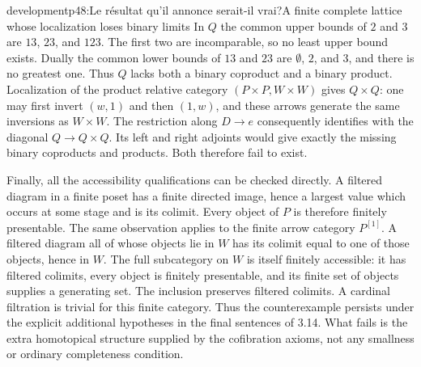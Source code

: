 \begin{dcomment}{development}{p48:Le résultat qu'il annonce serait-il vrai?}{A finite complete lattice whose localization loses binary limits}
In $Q$ the common upper bounds of $2$ and $3$ are $13$, $23$, and $123$. The first two are incomparable, so no least upper bound exists. Dually the common lower bounds of $13$ and $23$ are $\emptyset$, $2$, and $3$, and there is no greatest one. Thus $Q$ lacks both a binary coproduct and a binary product. Localization of the product relative category $(P\times P,W\times W)$ gives $Q\times Q$: one may first invert $(w,1)$ and then $(1,w)$, and these arrows generate the same inversions as $W\times W$. The restriction along $D\to e$ consequently identifies with the diagonal $Q\to Q\times Q$. Its left and right adjoints would give exactly the missing binary coproducts and products. Both therefore fail to exist.

Finally, all the accessibility qualifications can be checked directly. A filtered diagram in a finite poset has a finite directed image, hence a largest value which occurs at some stage and is its colimit. Every object of $P$ is therefore finitely presentable. The same observation applies to the finite arrow category $P^{[1]}$. A filtered diagram all of whose objects lie in $W$ has its colimit equal to one of those objects, hence in $W$. The full subcategory on $W$ is itself finitely accessible: it has filtered colimits, every object is finitely presentable, and its finite set of objects supplies a generating set. The inclusion preserves filtered colimits. A cardinal filtration is trivial for this finite category. Thus the counterexample persists under the explicit additional hypotheses in the final sentences of 3.14. What fails is the extra homotopical structure supplied by the cofibration axioms, not any smallness or ordinary completeness condition.
\end{dcomment}

